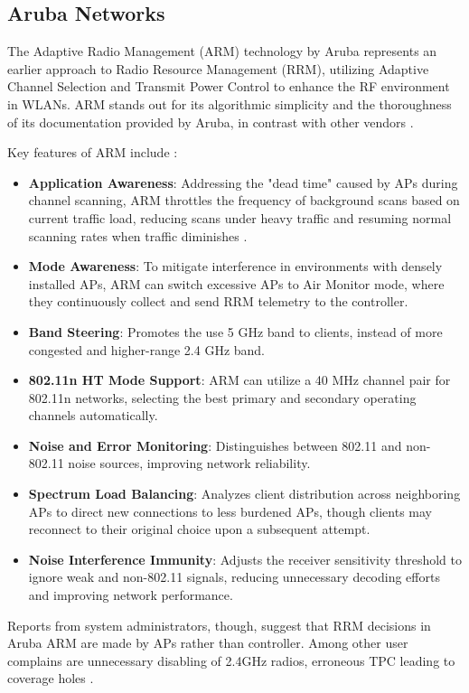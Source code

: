 \subsection{Aruba Networks}
The Adaptive Radio Management (ARM) technology by Aruba represents an earlier approach to Radio Resource Management (RRM), utilizing Adaptive Channel Selection and Transmit Power Control to enhance the RF environment in WLANs. ARM stands out for its algorithmic simplicity and the thoroughness of its documentation provided by Aruba, in contrast with other vendors \cite{ArubaOSUserGuide}.

Key features of ARM include \cite{ARMOverview}:
\begin{itemize}
\item \textbf{Application Awareness}: Addressing the "dead time" caused by APs during channel scanning, ARM throttles the frequency of background scans based on current traffic load, reducing scans under heavy traffic and resuming normal scanning rates when traffic diminishes \cite{UnderstandingARM}.
\item \textbf{Mode Awareness}: To mitigate interference in environments with densely installed APs, ARM can switch excessive APs to Air Monitor mode, where they continuously collect and send RRM telemetry to the controller.
\item \textbf{Band Steering}: Promotes the use 5 GHz band to clients, instead of more congested and higher-range 2.4 GHz band.
\item \textbf{802.11n HT Mode Support}: ARM can utilize a 40 MHz channel pair for 802.11n networks, selecting the best primary and secondary operating channels automatically.
\item \textbf{Noise and Error Monitoring}: Distinguishes between 802.11 and non-802.11 noise sources, improving network reliability.
\item \textbf{Spectrum Load Balancing}: Analyzes client distribution across neighboring APs to direct new connections to less burdened APs, though clients may reconnect to their original choice upon a subsequent attempt.
\item \textbf{Noise Interference Immunity}: Adjusts the receiver sensitivity threshold to ignore weak and non-802.11 signals, reducing unnecessary decoding efforts and improving network performance.
\end{itemize}

Reports from system administrators, though, suggest that RRM decisions in Aruba ARM are made by APs rather than controller. Among other user complains are unnecessary disabling of 2.4GHz radios, erroneous TPC leading to coverage holes \cite{TamingArubaARM2012}.

